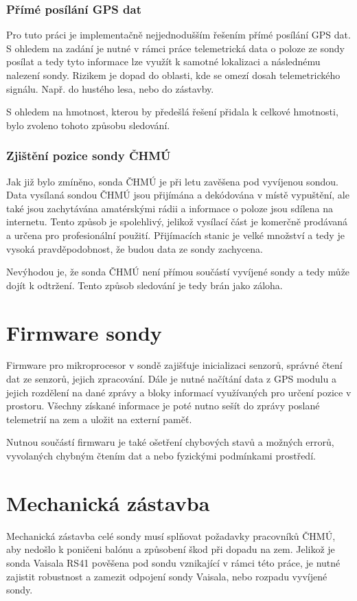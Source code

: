 \documentclass[twoside]{ctuthesis}
\theoremstyle{plain}
\theoremstyle{definition}
\theoremstyle{note}
\begin{document}
			\subsubsection{Přímé posílání GPS dat}
			Pro tuto práci je implementačně nejjednodušším řešením přímé posílání GPS dat. S ohledem na zadání je nutné v rámci práce telemetrická data o poloze ze sondy posílat a tedy tyto informace lze využít k samotné lokalizaci a následnému nalezení sondy. Rizikem je dopad do oblasti, kde se omezí dosah telemetrického signálu. Např. do hustého lesa, nebo do zástavby.

			S ohledem na hmotnost, kterou by předešlá řešení přidala k celkové hmotnosti, bylo zvoleno tohoto způsobu sledování.

			\subsubsection{Zjištění pozice sondy ČHMÚ}
			Jak již bylo zmíněno, sonda ČHMÚ je při letu zavěšena pod vyvíjenou sondou. Data vysílaná sondou ČHMÚ jsou přijímána a dekódována v místě vypuštění, ale také jsou zachytávána amatérskými rádii a informace o poloze jsou sdílena na internetu. Tento způsob je spolehlivý, jelikož vysílací část je komerčně prodávaná a určena pro profesionální použití. Přijímacích stanic je velké množství a tedy je vysoká pravděpodobnost, že budou data ze sondy zachycena. 

			Nevýhodou je, že sonda ČHMÚ není přímou součástí vyvíjené sondy a tedy může dojít k odtržení. Tento způsob sledování je tedy brán jako záloha.


		
	\section{Firmware sondy}
	Firmware pro mikroprocesor v sondě zajišťuje inicializaci senzorů, správné čtení dat ze senzorů, jejich zpracování. Dále je nutné načítání data z GPS modulu a jejich rozdělení na dané zprávy a bloky informací využívaných pro určení pozice v prostoru. Všechny získané informace je poté nutno sešít do zprávy poslané telemetrií na zem a uložit na externí paměť. 

	Nutnou součástí firmwaru je také ošetření chybových stavů a možných errorů, vyvolaných chybným čtením dat a nebo fyzickými podmínkami prostředí.

	\section{Mechanická zástavba}
	Mechanická zástavba celé sondy musí splňovat požadavky pracovníků ČHMÚ, aby nedošlo k poničeni balónu a způsobení škod při dopadu na zem. Jelikož je sonda Vaisala RS41 pověšena pod sondu vznikající v rámci této práce, je nutné zajistit robustnost a zamezit odpojení sondy Vaisala, nebo rozpadu vyvíjené sondy.
\end{document}
